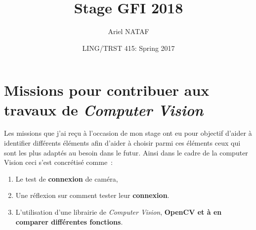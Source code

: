

\setcounter{secnumdepth}{7} %
\setcounter{tocdepth}{7}    %

\title{Stage GFI 2018\\ }
\author{Ariel NATAF}
\date{LING/TRST 415: Spring 2017}

\vspace*{\fill}
\cleardoublepage
	\tableofcontents
\setlength{\parskip}{\baselineskip}%
\vspace*{\fill}
\newpage
\cleardoublepage



\newpage
\section*{Missions pour contribuer aux travaux de \textit{Computer Vision}}

Les missions que j'ai reçu à l'occasion de mon stage ont eu pour objectif d'aider à identifier différents éléments afin d'aider à choisir parmi ces éléments ceux qui sont les plus adaptés au besoin dans le futur. Ainsi dans le cadre de la computer Vision ceci s'est concrétisé comme~:
\begin{enumerate}
\item Le test de \textbf{connexion} de caméra,
\item Une réflexion sur comment tester leur \textbf{connexion}.
\item L'utilisation  d'une librairie de \textit{Computer Vision}, \textbf{OpenCV et à en comparer différentes fonctions}.
\end{enumerate}
\cleardoublepage

\cleardoublepage

\cleardoublepage


\newpage

\nocite{*}
\printbibliography


